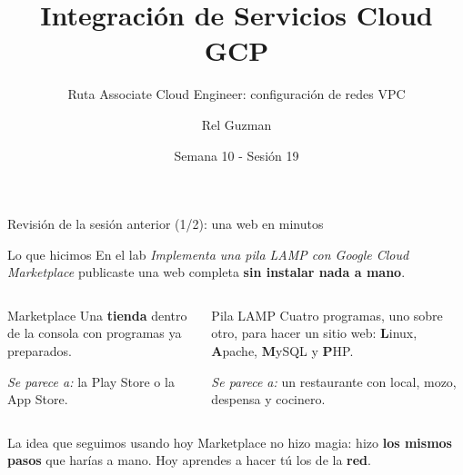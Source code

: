 \documentclass[aspectratio=169,10pt,c]{beamer}
\title{Integración de Servicios Cloud GCP}
\subtitle{Ruta Associate Cloud Engineer: configuración de redes VPC}
\date{Semana 10 - Sesión 19}
\author{Rel Guzman}
\begin{document}
{\maketitle}

\begin{frame}{Revisión de la sesión anterior (1/2): una web en minutos}
\begin{block}{Lo que hicimos}
\small En el lab \emph{Implementa una pila LAMP con Google Cloud Marketplace} publicaste una web completa \textbf{sin instalar nada a mano}.
\end{block}
\begin{columns}[T,onlytextwidth]
\begin{exampleblock}{Marketplace}
\small Una \textbf{tienda} dentro de la consola con programas ya preparados.\par\smallskip
\emph{Se parece a:} la Play Store o la App Store.
\end{exampleblock}
\begin{exampleblock}{Pila LAMP}
\small Cuatro programas, uno sobre otro, para hacer un sitio web: \textbf{L}inux, \textbf{A}pache, \textbf{M}ySQL y \textbf{P}HP.\par\smallskip
\emph{Se parece a:} un restaurante con local, mozo, despensa y cocinero.
\end{exampleblock}
\end{columns}
\par\vspace{1mm}
\begin{alertblock}{La idea que seguimos usando hoy}
\small Marketplace no hizo magia: hizo \textbf{los mismos pasos} que harías a mano. Hoy aprendes a hacer tú los de la \textbf{red}.
\end{alertblock}
\end{frame}
\end{document}
